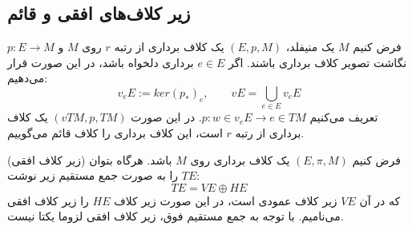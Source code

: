\subsection{زیر کلاف‌های افقی و قائم}
\begin{definition}
فرض  کنیم  $  M $ یک  منیفلد،  $ (E,p,M) $ یک  کلاف  برداری  از  رتبه  $ r $  روی  $ M $  و $ p:E \rightarrow M $  نگاشت  تصویر  کلاف  برداری  باشند.  اگر  $ e \in E $  برداری  دلخواه  باشد، در  این  صورت  قرار   می‌دهیم: 
\begin{equation*}
v_eE := ker(p_*)_e, \qquad vE= \bigcup_{e \in E} v_eE
\end{equation*}
تعریف  می‌کنیم  $ p:w \in v_eE \rightarrow e \in TM $.  در  این  صورت  $ (vTM,p,TM) $  یک  کلاف برداری از  رتبه  $ r $ است، این  کلاف  برداری  را  کلاف  قائم  می‌گوییم.
\end{definition}
\begin{definition}(زیر کلاف افقی)
فرض  کنیم $ (E,\pi,M) $  یک  کلاف  برداری  روی  $ M $  باشد. هرگاه  بتوان  $ TE $ را  به  صورت  جمع مستقیم زیر نوشت:
\begin{equation*}
TE=VE \oplus HE
\end{equation*}
که  در  آن  $ VE $ زیر کلاف عمودی است،  در  این  صورت  زیر کلاف  $ HE $  را  زیر کلاف  افقی  می‌نامیم.  با  توجه  به  جمع  مستقیم  فوق،  زیر کلاف  افقی  لزوما  یکتا  نیست.
\end{definition}

